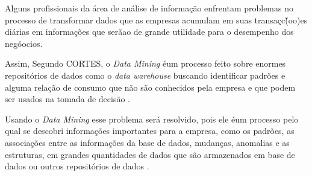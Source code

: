 Alguns profissionais da \'{a}rea de an\'{a}lise de informa\c{c}\~{a}o enfrentam problemas no processo de transformar dados que as empresas acumulam em suas transa\c{c}c\~(oo)es di\'{a}rias em informa\c{c}\~{o}es que ser\~{a}ao de grande utilidade para o desempenho dos neg\'{o}ocios. 

Assim, Segundo CORTES, o \textit{Data Mining} \'{e}um processo feito sobre enormes reposit\'{o}rios de dados como o \textit{data warehouse} buscando identificar padr\~{o}es e alguma rela\c{c}\~{a}o de consumo que n\~{a}o s\~{a}o conhecidos pela empresa e que podem ser usados na tomada de decis\~{a}o \cite{bi-cortes-2008}.

Usando o \textit{Data Mining} esse problema ser\'{a} resolvido, pois ele \'{e}um processo pelo qual se descobri informa\c{c}\~{o}es importantes para a empresa, como os padr\~{o}es, as associa\c{c}\~{o}es entre as informa\c{c}\~{o}es da base de dados, mudan\c{c}as, anomalias e as estruturas, em grandes quantidades de dados que s\~{a}o armazenados em base de dados ou outros reposit\'{o}rios de dados \cite{bi-cortes-2008}.
